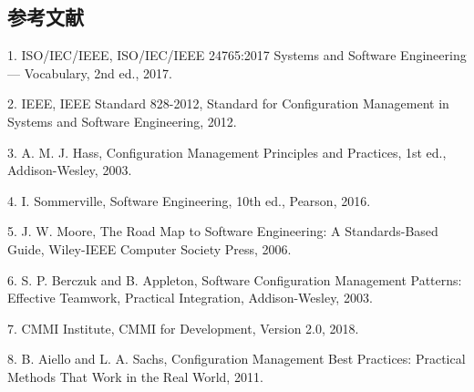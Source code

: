 \subsection*{参考文献}
1. ISO/IEC/IEEE, ISO/IEC/IEEE 24765:2017 Systems and Software Engineering — Vocabulary, 2nd ed., 2017.

2. IEEE, IEEE Standard 828-2012, Standard for Configuration Management in Systems and Software Engineering, 2012.

3. A. M. J. Hass, Configuration Management Principles and Practices, 1st ed., Addison-Wesley, 2003.

4. I. Sommerville, Software Engineering, 10th ed., Pearson, 2016.

5. J. W. Moore, The Road Map to Software Engineering: A Standards-Based Guide, Wiley-IEEE Computer Society Press, 2006.

6. S. P. Berczuk and B. Appleton, Software Configuration Management Patterns: Effective Teamwork, Practical Integration, Addison-Wesley, 2003.

7. CMMI Institute, CMMI for Development, Version 2.0, 2018.

8. B. Aiello and L. A. Sachs, Configuration Management Best Practices: Practical Methods That Work in the Real World, 2011.
